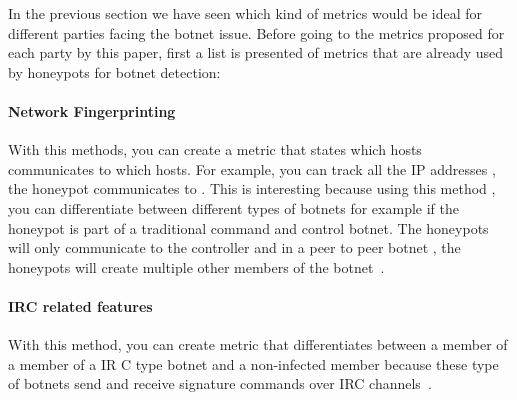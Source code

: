 

In the previous section we have seen which kind of metrics would be ideal for different parties facing the botnet issue. Before going to the metrics proposed for each party by this paper, first a list is presented of metrics that are already used by honeypots for botnet detection:

\paragraph{Network Fingerprinting}
With this methods,  you can create a metric that states which hosts communicates to which hosts. For example, you can track all the IP addresses , the honeypot communicates to	. This is interesting because using this method , you can differentiate between different types of botnets for example if  the honeypot is part of a traditional command and control botnet. The honeypots will only communicate to the controller and  in a peer to peer botnet , the honeypots will create multiple other members of the botnet~\cite{GJ2007}.

\paragraph{IRC related features}
With this method, you can create metric that differentiates between a member of a member of a IR C type botnet and a non-infected member because these type of botnets  send and receive signature commands over IRC channels~\cite{AM2006}.

